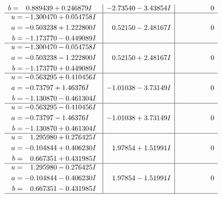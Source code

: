 \documentclass[1p]{elsarticle_modified}
\theoremstyle{definition}
\begin{document}
$$\begin{array}{c|c|c}
\begin{aligned}
b &= \phantom{-}0.889439 + 0.246879 I\end{aligned}
 & -2.73540 - 3.43854 I & \phantom{-0.000000 } 0 \\ \hline\begin{aligned}
u &= -1.300470 + 0.054758 I \\
a &= -0.503238 + 1.222800 I \\
b &= -1.173770 - 0.449089 I\end{aligned}
 & \phantom{-}0.52150 - 2.48167 I & \phantom{-0.000000 } 0 \\ \hline\begin{aligned}
u &= -1.300470 - 0.054758 I \\
a &= -0.503238 - 1.222800 I \\
b &= -1.173770 + 0.449089 I\end{aligned}
 & \phantom{-}0.52150 + 2.48167 I & \phantom{-0.000000 } 0 \\ \hline\begin{aligned}
u &= -0.563295 + 0.410456 I \\
a &= -0.73797 + 1.46376 I \\
b &= -1.130870 - 0.461304 I\end{aligned}
 & -1.01038 - 3.73149 I & \phantom{-0.000000 } 0 \\ \hline\begin{aligned}
u &= -0.563295 - 0.410456 I \\
a &= -0.73797 - 1.46376 I \\
b &= -1.130870 + 0.461304 I\end{aligned}
 & -1.01038 + 3.73149 I & \phantom{-0.000000 } 0 \\ \hline\begin{aligned}
u &= \phantom{-}1.295980 + 0.276425 I \\
a &= -0.104844 + 0.406230 I \\
b &= \phantom{-}0.667351 + 0.431985 I\end{aligned}
 & \phantom{-}1.97854 + 1.51991 I & \phantom{-0.000000 } 0 \\ \hline\begin{aligned}
u &= \phantom{-}1.295980 - 0.276425 I \\
a &= -0.104844 - 0.406230 I \\
b &= \phantom{-}0.667351 - 0.431985 I\end{aligned}
 & \phantom{-}1.97854 - 1.51991 I & \phantom{-0.000000 } 0\\
 \hline 
 \end{array}$$\newpage$$\begin{array}{c|c|c}  

\end{array}$$
\end{document}
